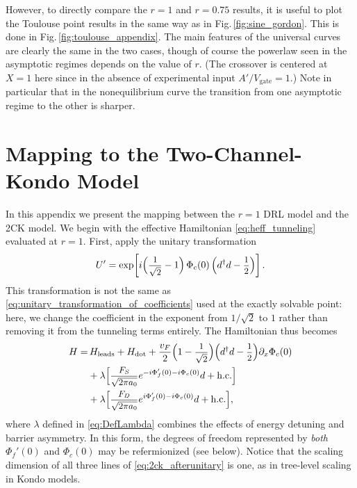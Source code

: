 \documentclass[aps,prb,reprint,floatfix,superscriptaddress,amssymb,amsmath]{revtex4-2}
\newcommand{\Vg}{V_\text{gate}}
\newcommand{\sdfrac}[2]{\mbox{\small$\displaystyle\frac{#1}{#2}$}}
\begin{document}
However, to directly compare the $r\!=\!1$ and $r\!=\!0.75$ results, it is useful to plot the Toulouse point results in the same way as in Fig.\,\ref{fig:sine_gordon}. This is done in Fig.\,\ref{fig:toulouse_appendix}. The main features of the universal curves are clearly the same in the two cases, though of course the powerlaw seen in the asymptotic regimes depends on the value of $r$. (The crossover is centered at $X\!=\!1$ here since in the absence of experimental input $A'/\Vg\!=\!1$.) Note in particular that in the nonequilibrium curve the transition from one asymptotic regime to the other is sharper. 


\section{Mapping to the Two-Channel-Kondo Model}\label{sec:2CKmapping}

In this appendix we present the mapping between the $r \!=\! 1$ DRL model and the 2CK model.
We begin with the effective Hamiltonian \eqref{eq:heff_tunneling} evaluated at $r \!=\! 1$. First, apply the unitary transformation
\begin{equation}
    U'=\exp\!\left[i  \Big(\sdfrac{1}{\sqrt{2}} - 1\Big) \, \Phi_c(0) \, 
    \Big(d^{\dagger} d - \sdfrac{1}{2}\Big) \right].
 \label{eq:rotation_map_to_2ck}
\end{equation}
This transformation 
is not the same as  \eqref{eq:unitary_transformation_of_coefficients} used at the exactly solvable point: here, we change the coefficient in the exponent from $1/\sqrt{2}$ to $1$ rather than removing it from the tunneling terms entirely. The Hamiltonian thus becomes 
\begin{align}
H =&\, H_{\text{leads}} + H_{\text{dot}} 
+ \frac{v_F}{2} \Big(1-\sdfrac{1}{\sqrt{2}}\Big) \Big(d^{\dagger} d - \sdfrac{1}{2}\Big) \partial_x \Phi_c(0) 
\notag\\
& + \lambda\Big[\sdfrac{F_{S}}{\sqrt{2\pi a_0}} e^{-i  \Phi_f'(0) - i\Phi_c(0)} d + \text{h.c.} \Big] 
\label{eq:2ck_afterunitary}\\
& + \lambda\Big[\sdfrac{F_{D}}{\sqrt{2\pi a_0}} e^{  i \Phi_f'(0) - i \Phi_c(0)} d + \text{h.c.} \Big] , \notag
\end{align}
where $\lambda$ defined in \eqref{eq:DefLambda} combines the effects of energy detuning and barrier asymmetry. In this form, the degrees of freedom represented by \emph{both} $\Phi_f'(0)$ and $\Phi_c(0)$ may be refermionized (see below).
Notice that the scaling dimension of all three lines of \eqref{eq:2ck_afterunitary} is one, as in tree-level scaling in Kondo models.  
\end{document}
